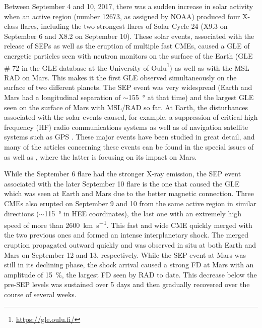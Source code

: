 Between September 4 and 10, 2017, there was a sudden increase in solar activity when an active region (number 12673, as assigned by NOAA) produced four X-class flares, including the two strongest flares of Solar Cycle 24 (X9.3 on September 6 and X8.2 on September 10).
These solar events, associated with the release of \acp{SEP} as well as the eruption of multiple fast \acp{CME}, caused a \ac{GLE} of energetic particles seen with neutron monitors on the surface of the Earth (\ac{GLE} \# 72 in the \ac{GLE} database at the University of Oulu\footnote{\url{https://gle.oulu.fi/}}) as well as with the \ac{MSL} \ac{RAD} on Mars. This makes it the first \ac{GLE} observed simultaneously on the surface of two different planets.
The \ac{SEP} event was very widespread (Earth and Mars had a longitudinal separation of $\sim$\SI{155}{\degree} at that time) and the largest \ac{GLE} seen on the surface of Mars with \ac{MSL}/\ac{RAD} so far. At Earth, the disturbances associated with the solar events caused, for example, a suppression of critical high frequency (HF) radio communications systems \citep{Frissell-2018,Bland-2018} as well as of navigation satellite systems such as GPS \citep{Berdermann-2018,Sato-2019}.
These major events have been studied in great detail, and many of the articles concerning these events can be found in the special issues of \citet{SpaceWeather-2018-special-issue-September-event} as well as \citet{GRL-2018-special-issue-September-event}, where the latter is focusing on its impact on Mars.

While the September 6 flare had the stronger X-ray emission, the \ac{SEP} event associated with the later September 10 flare is the one that caused the \ac{GLE} which was seen at Earth and Mars due to the better magnetic connection. Three \acp{CME} also erupted on September 9 and 10 from the same active region in similar directions ($\sim$\SI{115}{\degree} in \ac{HEE} coordinates), the last one with an extremely high speed of more than \SI{2600}{\kilo\meter\per\second}. This fast and wide \ac{CME} quickly merged with the two previous ones and formed an intense interplanetary shock. The merged eruption propagated outward quickly and was observed in situ at both Earth and Mars on September 12 and 13, respectively. While the \ac{SEP} event at Mars was still in its declining phase, the shock arrival caused a strong \ac{FD} at Mars with an amplitude of \SI{15}{\percent}, the largest \ac{FD} seen by \ac{RAD} to date. This decrease below the pre-\ac{SEP} levels was sustained over 5 days and then gradually recovered over the course of several weeks.

